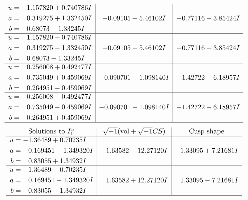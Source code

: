 \documentclass[1p]{elsarticle_modified}
\theoremstyle{definition}
\newcommand{\I}{\sqrt{-1}}
\begin{document}
$$\begin{array}{c|c|c}
\begin{aligned}
u &= \phantom{-}1.157820 + 0.740786 I \\
a &= \phantom{-}0.319275 + 1.332450 I \\
b &= \phantom{-}0.68073 - 1.33245 I\end{aligned}
 & -0.09105 + 5.46102 I & -0.77116 - 3.85424 I \\ \hline\begin{aligned}
u &= \phantom{-}1.157820 - 0.740786 I \\
a &= \phantom{-}0.319275 - 1.332450 I \\
b &= \phantom{-}0.68073 + 1.33245 I\end{aligned}
 & -0.09105 - 5.46102 I & -0.77116 + 3.85424 I \\ \hline\begin{aligned}
u &= \phantom{-}0.256008 + 0.492477 I \\
a &= \phantom{-}0.735049 + 0.459069 I \\
b &= \phantom{-}0.264951 - 0.459069 I\end{aligned}
 & -0.090701 + 1.098140 I & -1.42722 - 6.18957 I \\ \hline\begin{aligned}
u &= \phantom{-}0.256008 - 0.492477 I \\
a &= \phantom{-}0.735049 - 0.459069 I \\
b &= \phantom{-}0.264951 + 0.459069 I\end{aligned}
 & -0.090701 - 1.098140 I & -1.42722 + 6.18957 I\\
 \hline 
 \end{array}$$\newpage$$\begin{array}{c|c|c}  
\text{Solutions to }I^u_{1}& \I (\text{vol} + \sqrt{-1}CS) & \text{Cusp shape}\\
 \hline 
\begin{aligned}
u &= -1.36489 + 0.70235 I \\
a &= \phantom{-}0.169451 - 1.349320 I \\
b &= \phantom{-}0.83055 + 1.34932 I\end{aligned}
 & \phantom{-}1.63582 - 12.27120 I & \phantom{-}1.33095 + 7.21681 I \\ \hline\begin{aligned}
u &= -1.36489 - 0.70235 I \\
a &= \phantom{-}0.169451 + 1.349320 I \\
b &= \phantom{-}0.83055 - 1.34932 I\end{aligned}
 & \phantom{-}1.63582 + 12.27120 I & \phantom{-}1.33095 - 7.21681 I\\
 \hline 
 \end{array}$$\newpage\newpage\renewcommand{\arraystretch}{1}
\end{document}
